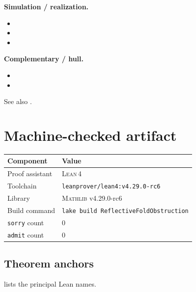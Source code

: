 \documentclass[11pt]{article}
\theoremstyle{plain}
\theoremstyle{definition}
\theoremstyle{remark}
\newcommand{\Lean}{\textsc{Lean\,4}}
\newcommand{\Mathlib}{\textsc{Mathlib}}
\begin{document}
\noindent\textbf{Simulation / realization.}
\begin{itemize}[nosep,leftmargin=1.5em]
  \item {}
  \item {}
  \item {}
\end{itemize}

\noindent\textbf{Complementary / hull.}
\begin{itemize}[nosep,leftmargin=1.5em]
  \item {}
  \item {}
\end{itemize}

\noindent See also .

\section{Machine-checked artifact}\label{sec:artifact}

\begin{center}
\begin{tabular}{@{}ll@{}}
\toprule
\textbf{Component} & \textbf{Value} \\
\midrule
Proof assistant & \Lean{} \\
Toolchain & \texttt{leanprover/lean4:v4.29.0-rc6} \\
Library & \Mathlib{} v4.29.0-rc6 \\
Build command & \texttt{lake build ReflectiveFoldObstruction} \\
\texttt{sorry} count & 0 \\
\texttt{admit} count & 0 \\
\bottomrule
\end{tabular}
\end{center}

\subsection*{Theorem anchors}

 lists the principal Lean names.
\end{document}
